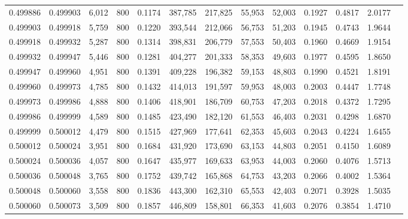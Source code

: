 \begin{tabular}{rrrrrrrrrrrrr}
0.499886 & 0.499903 & 6,012 & 800 &                                     0.1174 & 387,785 & 217,825 &  55,953 &  52,003 & 0.1927 & 0.4817 & 2.0177 \\
0.499903 & 0.499918 & 5,759 & 800 &                                     0.1220 & 393,544 & 212,066 &  56,753 &  51,203 & 0.1945 & 0.4743 & 1.9644 \\
0.499918 & 0.499932 & 5,287 & 800 &                                     0.1314 & 398,831 & 206,779 &  57,553 &  50,403 & 0.1960 & 0.4669 & 1.9154 \\
0.499932 & 0.499947 & 5,446 & 800 &                                     0.1281 & 404,277 & 201,333 &  58,353 &  49,603 & 0.1977 & 0.4595 & 1.8650 \\
0.499947 & 0.499960 & 4,951 & 800 &                                     0.1391 & 409,228 & 196,382 &  59,153 &  48,803 & 0.1990 & 0.4521 & 1.8191 \\
0.499960 & 0.499973 & 4,785 & 800 &                                     0.1432 & 414,013 & 191,597 &  59,953 &  48,003 & 0.2003 & 0.4447 & 1.7748 \\
0.499973 & 0.499986 & 4,888 & 800 &                                     0.1406 & 418,901 & 186,709 &  60,753 &  47,203 & 0.2018 & 0.4372 & 1.7295 \\
0.499986 & 0.499999 & 4,589 & 800 &                                     0.1485 & 423,490 & 182,120 &  61,553 &  46,403 & 0.2031 & 0.4298 & 1.6870 \\
0.499999 & 0.500012 & 4,479 & 800 &                                     0.1515 & 427,969 & 177,641 &  62,353 &  45,603 & 0.2043 & 0.4224 & 1.6455 \\
0.500012 & 0.500024 & 3,951 & 800 &                                     0.1684 & 431,920 & 173,690 &  63,153 &  44,803 & 0.2051 & 0.4150 & 1.6089 \\
0.500024 & 0.500036 & 4,057 & 800 &                                     0.1647 & 435,977 & 169,633 &  63,953 &  44,003 & 0.2060 & 0.4076 & 1.5713 \\
0.500036 & 0.500048 & 3,765 & 800 &                                     0.1752 & 439,742 & 165,868 &  64,753 &  43,203 & 0.2066 & 0.4002 & 1.5364 \\
0.500048 & 0.500060 & 3,558 & 800 &                                     0.1836 & 443,300 & 162,310 &  65,553 &  42,403 & 0.2071 & 0.3928 & 1.5035 \\
0.500060 & 0.500073 & 3,509 & 800 &                                     0.1857 & 446,809 & 158,801 &  66,353 &  41,603 & 0.2076 & 0.3854 & 1.4710 \\

\end{tabular}
